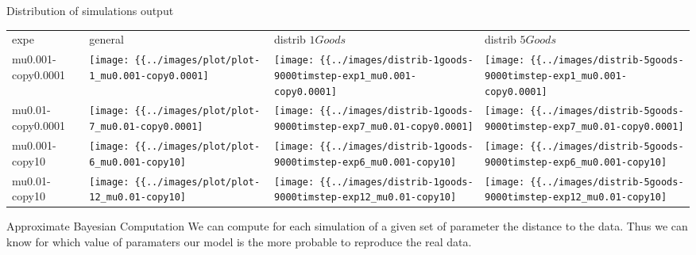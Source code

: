 \documentclass[12pt, notes=show]{beamer}
\begin{document}
\begin{frame}{Distribution of simulations output}
    \tiny

	\begin{table}
	    \begin{tabular}{m{2.1cm}m{2.1cm}m{2.1cm}m{2.1cm}}
		expe & general & distrib $1Goods$ & distrib $5Goods$ \\
		mu0.001-copy0.0001 & 

		\texttt{[image: \{\{../images/plot/plot-1\_mu0.001-copy0.0001]}}} &
		\texttt{[image: \{\{../images/distrib-1goods-9000timstep-exp1\_mu0.001-copy0.0001]}}} &
		\texttt{[image: \{\{../images/distrib-5goods-9000timstep-exp1\_mu0.001-copy0.0001]}}} \\

		mu0.01-copy0.0001 & 

		\texttt{[image: \{\{../images/plot/plot-7\_mu0.01-copy0.0001]}}} &
		\texttt{[image: \{\{../images/distrib-1goods-9000timstep-exp7\_mu0.01-copy0.0001]}}} &
		\texttt{[image: \{\{../images/distrib-5goods-9000timstep-exp7\_mu0.01-copy0.0001]}}} \\


		mu0.001-copy10 & 

		\texttt{[image: \{\{../images/plot/plot-6\_mu0.001-copy10]}}} &
		\texttt{[image: \{\{../images/distrib-1goods-9000timstep-exp6\_mu0.001-copy10]}}} &
		\texttt{[image: \{\{../images/distrib-5goods-9000timstep-exp6\_mu0.001-copy10]}}} \\

		mu0.01-copy10 & 

		\texttt{[image: \{\{../images/plot/plot-12\_mu0.01-copy10]}}} &
		\texttt{[image: \{\{../images/distrib-1goods-9000timstep-exp12\_mu0.01-copy10]}}} &
		\texttt{[image: \{\{../images/distrib-5goods-9000timstep-exp12\_mu0.01-copy10]}}} \\

	    \end{tabular}
	\end{table}

\end{frame}

\begin{frame}{Approximate Bayesian Computation}
    We can compute for each simulation of a given set of parameter the distance to the data.
    Thus we can know for which value of paramaters our model is the more probable to reproduce the real data.
\end{frame}
\end{document}
